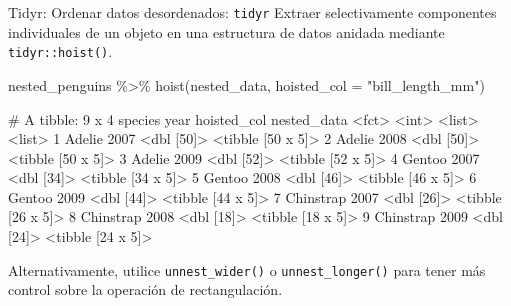 \documentclass[
  ignorenonframetext,
  aspectratio=169]{beamer}
\newenvironment{Shaded}{\begin{snugshade}}{\end{snugshade}}
\newcommand{\AttributeTok}[1]{\textcolor[rgb]{0.77,0.63,0.00}{#1}}
\newcommand{\FunctionTok}[1]{\textcolor[rgb]{0.00,0.00,0.00}{#1}}
\newcommand{\NormalTok}[1]{#1}
\newcommand{\SpecialCharTok}[1]{\textcolor[rgb]{0.00,0.00,0.00}{#1}}
\newcommand{\StringTok}[1]{\textcolor[rgb]{0.31,0.60,0.02}{#1}}
\let\oldverbatim\verbatim
\let\endoldverbatim\endverbatim
\renewenvironment{verbatim}{\tiny\oldverbatim}{\endoldverbatim}
\begin{document}
\begin{frame}[fragile]{Tidyr: Ordenar datos desordenados:
\texttt{tidyr}}
\protect\hypertarget{tidyr-ordenar-datos-desordenados-tidyr-6}{}
Extraer selectivamente componentes individuales de un objeto en una
estructura de datos anidada mediante \texttt{tidyr::hoist()}.

\begin{Shaded}
\begin{Highlighting}[]
\NormalTok{nested\_penguins }\SpecialCharTok{\%\textgreater{}\%} \FunctionTok{hoist}\NormalTok{(nested\_data, }\AttributeTok{hoisted\_col =} \StringTok{"bill\_length\_mm"}\NormalTok{)}
\end{Highlighting}
\end{Shaded}

\begin{verbatim}
# A tibble: 9 x 4
  species    year hoisted_col nested_data      
  <fct>     <int> <list>      <list>           
1 Adelie     2007 <dbl [50]>  <tibble [50 x 5]>
2 Adelie     2008 <dbl [50]>  <tibble [50 x 5]>
3 Adelie     2009 <dbl [52]>  <tibble [52 x 5]>
4 Gentoo     2007 <dbl [34]>  <tibble [34 x 5]>
5 Gentoo     2008 <dbl [46]>  <tibble [46 x 5]>
6 Gentoo     2009 <dbl [44]>  <tibble [44 x 5]>
7 Chinstrap  2007 <dbl [26]>  <tibble [26 x 5]>
8 Chinstrap  2008 <dbl [18]>  <tibble [18 x 5]>
9 Chinstrap  2009 <dbl [24]>  <tibble [24 x 5]>
\end{verbatim}

Alternativamente, utilice \texttt{unnest\_wider()} o
\texttt{unnest\_longer()} para tener más control sobre la operación de
rectangulación.
\end{frame}
\end{document}
